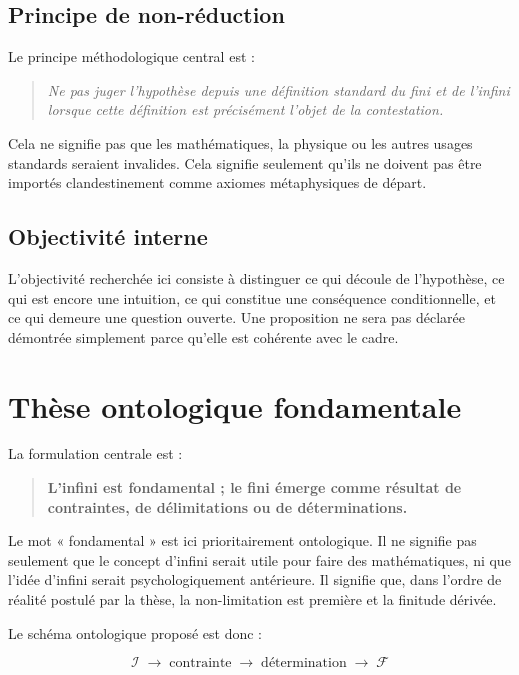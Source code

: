 \documentclass[11pt,a4paper]{article}
\newcommand{\Inf}{\mathcal I}
\newcommand{\Fin}{\mathcal F}
\begin{document}
\subsection{Principe de non-réduction}

Le principe méthodologique central est :

\begin{quote}
\emph{Ne pas juger l'hypothèse depuis une définition standard du fini et de l'infini lorsque cette définition est précisément l'objet de la contestation.}
\end{quote}

Cela ne signifie pas que les mathématiques, la physique ou les autres usages standards seraient invalides. Cela signifie seulement qu'ils ne doivent pas être importés clandestinement comme axiomes métaphysiques de départ.

\subsection{Objectivité interne}

L'objectivité recherchée ici consiste à distinguer ce qui découle de l'hypothèse, ce qui est encore une intuition, ce qui constitue une conséquence conditionnelle, et ce qui demeure une question ouverte. Une proposition ne sera pas déclarée démontrée simplement parce qu'elle est cohérente avec le cadre.

\section{Thèse ontologique fondamentale}

La formulation centrale est :

\begin{quote}
\textbf{L'infini est fondamental ; le fini émerge comme résultat de contraintes, de délimitations ou de déterminations.}
\end{quote}

Le mot « fondamental » est ici prioritairement ontologique. Il ne signifie pas seulement que le concept d'infini serait utile pour faire des mathématiques, ni que l'idée d'infini serait psychologiquement antérieure. Il signifie que, dans l'ordre de réalité postulé par la thèse, la non-limitation est première et la finitude dérivée.

Le schéma ontologique proposé est donc :

\[
\boxed{
\Inf
\;\longrightarrow\;
\text{contrainte}
\;\longrightarrow\;
\text{détermination}
\;\longrightarrow\;
\Fin
}
\]
\end{document}

